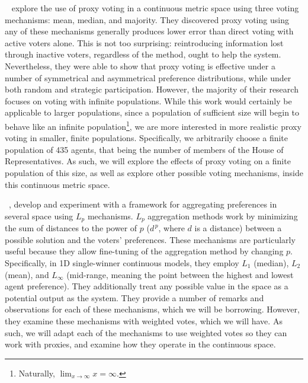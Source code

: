 ~\cite{Cohensius2017} explore the use of proxy voting in a
continuous metric space using three voting mechanisms: mean, median, and majority.
They discovered proxy voting using any of these mechanisms generally produces lower
error than direct voting with active voters alone.
This is not too surprising: reintroducing information lost through inactive voters,
regardless of the method, ought to help the system.
Nevertheless, they were able to show that proxy voting is effective under a number of
symmetrical and asymmetrical preference distributions, while under both random and
strategic participation.
However, the majority of their research focuses on voting with infinite populations.
While this work would certainly be applicable to larger populations, since a
population of sufficient size will begin to behave like an infinite
population\footnote{
    Naturally, $\lim_{x \rightarrow \infty} x = \infty$.
}, we are more interested in more realistic proxy voting in smaller, finite
populations.
Specifically, we arbitrarily choose a finite population of 435 agents, that being the
number of members of the House of Representatives.
As such, we will explore the effects of proxy voting on a finite population of this
size, as well as explore other possible voting mechanisms, inside this continuous
metric space.

~\cite{Bulteau2021}, develop and experiment with a framework for
aggregating preferences in several space using $L_p$ mechanisms.
$L_p$ aggregation methods work by minimizing the sum of distances to the power of $p$
($d^{\,p}$, where $d$ is a distance) between a possible solution and the voters'
preferences.
These mechanisms are particularly useful because they allow fine-tuning of the
aggregation method by changing $p$.
Specifically, in 1D single-winner continuous models, they employ $L_1$ (median),
$L_2$ (mean), and $L_{\infty}$ (mid-range, meaning the point between the highest and
lowest agent preference).
They additionally treat any possible value in the space as a potential output as the
system.
They provide a number of remarks and observations for each of these mechanisms, which
we will be borrowing.
However, they examine these mechanisms with weighted votes, which we will have.
As such, we will adapt each of the mechanisms to use weighted votes so they can work
with proxies, and examine how they operate in the continuous space.

